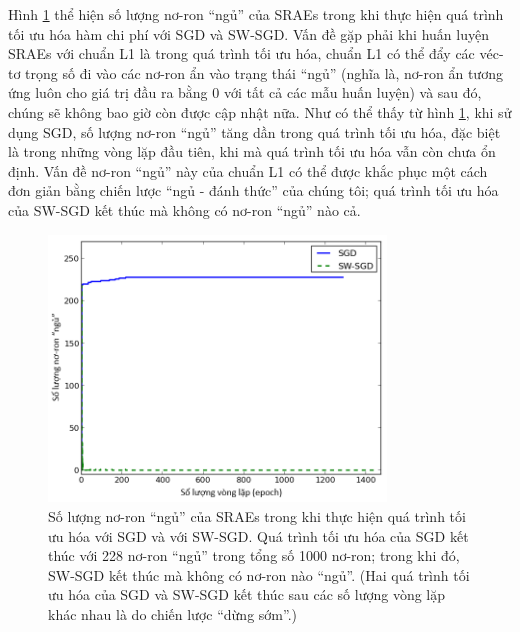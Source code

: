 Hình \ref{fig_SGDvsSWSGD} thể hiện số lượng nơ-ron ``ngủ'' của SRAEs trong khi thực hiện quá trình tối ưu hóa hàm chi phí với SGD và SW-SGD. Vấn đề gặp phải khi huấn luyện SRAEs với chuẩn L1 là trong quá trình tối ưu hóa, chuẩn L1 có thể đẩy các véc-tơ trọng số đi vào các nơ-ron ẩn vào trạng thái ``ngủ'' (nghĩa là, nơ-ron ẩn tương ứng luôn cho giá trị đầu ra bằng 0 với tất cả các mẫu huấn luyện) và sau đó, chúng sẽ không bao giờ còn được cập nhật nữa. Như có thể thấy từ hình \ref{fig_SGDvsSWSGD}, khi sử dụng SGD, số lượng nơ-ron ``ngủ'' tăng dần trong quá trình tối ưu hóa, đặc biệt là trong những vòng lặp đầu tiên, khi mà quá trình tối ưu hóa vẫn còn chưa ổn định. Vấn đề nơ-ron ``ngủ'' này của chuẩn L1 có thể được khắc phục một cách đơn giản bằng chiến lược ``ngủ - đánh thức'' của chúng tôi; quá trình tối ưu hóa của SW-SGD kết thúc mà không có nơ-ron ``ngủ'' nào cả.
\begin{figure}
	\centering
	\includegraphics[width=0.8\textwidth]{SGD_vs_SW-SGD}
	\caption[So sánh giữa SGD với SW-SGD]{Số lượng nơ-ron ``ngủ'' của SRAEs trong khi thực hiện quá trình tối ưu hóa với SGD và với SW-SGD. Quá trình tối ưu hóa của SGD kết thúc với 228 nơ-ron ``ngủ'' trong tổng số 1000 nơ-ron; trong khi đó, SW-SGD kết thúc mà không có nơ-ron nào ``ngủ''. (Hai quá trình tối ưu hóa của SGD và SW-SGD kết thúc sau các số lượng vòng lặp khác nhau là do chiến lược ``dừng sớm''.)}
	\label{fig_SGDvsSWSGD}
\end{figure}


